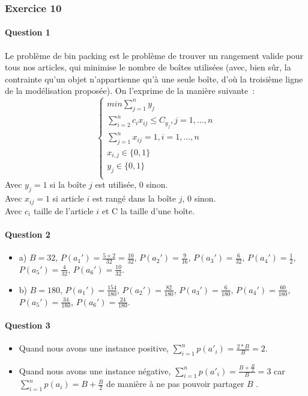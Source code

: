 \documentclass[a4paper, 12pt]{article}
\begin{document}
\subsubsection*{Exercice 10}

\paragraph{Question 1}

Le problème de bin packing est le problème de trouver un rangement
valide pour tous nos articles, qui minimise le nombre de boîtes
utilisées (avec, bien sûr, la contrainte qu'un objet n'appartienne
qu'à une seule boîte, d'où la troisième ligne de la modélisation
proposée).  On l'exprime de la manière suivante~:
\begin{equation}
\begin{cases}
min \sum_{j=1}^{n}y_j \\
\sum_{i=2}^{n} c_ix_{ij} \leq C_{y_j}, j = 1, \dots, n \\
\sum_{j=1}^{n}x_{ij}=1, i=1, \dots, n \\
x_{i,j} \in \{ 0,1 \} \\
y_j \in \{ 0,1 \} \\
\end{cases}
\end{equation}
Avec $y_j = 1$ si la boîte $j$ est utilisée, 0 sinon. \\
Avec $x_{ij} = 1 $ si article $i$ est rangé dans la boîte $j$, 0
sinon. \\
Avec $c_i$ taille de l'article $i$ et C la taille d'une boîte.


\paragraph{Question 2}
\begin{itemize}
\item a) $B = 32$, $P(a_1') = \frac{5 \times 2}{32} = \frac{10}{32}$,
  $P(a_2') = \frac{9}{16}$, $P(a_3')=\frac{6}{32}$,
  $P(a_4')=\frac{1}{2}$, $P(a_5')=\frac{4}{32}$, $P(a_6')=\frac{10}{32}$.
\item b) $B = 180$, $P(a_1') = \frac{154}{180}$,
  $P(a_2') = \frac{82}{180}$, $P(a_3')=\frac{6}{180}$,
  $P(a_4')=\frac{60}{180}$, $P(a_5')=\frac{34}{180}$, $P(a_6')=\frac{24}{180}$.
\end{itemize}

\paragraph{Question 3}
\begin{itemize}
\item Quand nous avons une instance positive, $\sum_{i=1}^n p(a'_i) =\frac{2*B}{B}=2$.
\item Quand nous avons une instance négative, $\sum_{i=1}^n p(a'_i)
  =\frac{B+\frac{B}{2}}{B}=3$ car $\sum_{i=1}^n p(a_i)= B+\frac{B}{2}$
  de manière à ne pas pouvoir partager $B$ .
\end{itemize}
\end{document}
